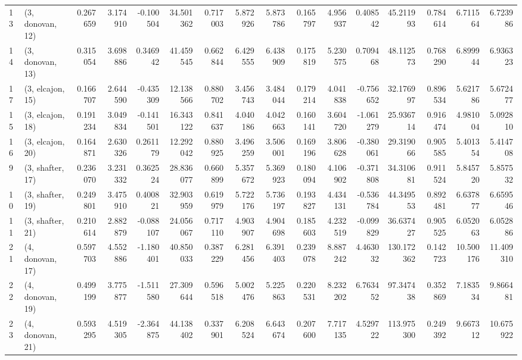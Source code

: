 \begin{tabular}{llrrrrrrrrrrrrrr}
13 &  (3, donovan, 12) &   0.267659 &  3.174910 & -0.100504 &  34.501362 &  0.717003 &   5.872926 &  5.873786 &  0.165797 &  4.956937 &  0.408542 &   45.211993 &  0.784614 &   6.711564 &   6.723986 \\
14 &  (3, donovan, 13) &   0.315054 &  3.698886 &  0.346942 &  41.459545 &  0.662844 &   6.429555 &  6.438909 &  0.175819 &  5.230575 &  0.709468 &   48.112573 &  0.768290 &   6.899944 &   6.936323 \\
17 &  (3, elcajon, 15) &   0.166707 &  2.644590 & -0.435309 &  12.138566 &  0.880702 &   3.456743 &  3.484044 &  0.179214 &  4.041838 & -0.756652 &   32.176997 &  0.896534 &   5.621786 &   5.672477 \\
15 &  (3, elcajon, 18) &   0.191234 &  3.049834 & -0.141501 &  16.343122 &  0.841637 &   4.040186 &  4.042663 &  0.160141 &  3.604720 & -1.061279 &   25.936714 &  0.916474 &   4.981004 &   5.092810 \\
16 &  (3, elcajon, 20) &   0.164871 &  2.630326 &  0.261179 &  12.292042 &  0.880925 &   3.496259 &  3.506001 &  0.169196 &  3.806628 & -0.380061 &   29.319066 &  0.905585 &   5.401354 &   5.414708 \\
9  &  (3, shafter, 17) &   0.236070 &  3.231332 &  0.362524 &  28.836077 &  0.660899 &   5.357672 &  5.369923 &  0.180094 &  4.106902 & -0.371808 &   34.310681 &  0.911524 &   5.845720 &   5.857532 \\
10 &  (3, shafter, 19) &   0.249801 &  3.475910 &  0.400821 &  32.903959 &  0.619979 &   5.722176 &  5.736197 &  0.193827 &  4.434131 & -0.536784 &   44.349553 &  0.892481 &   6.637877 &   6.659546 \\
11 &  (3, shafter, 21) &   0.210614 &  2.882879 & -0.088107 &  24.056067 &  0.717110 &   4.903907 &  4.904698 &  0.185603 &  4.232519 & -0.099829 &   36.637427 &  0.905525 &   6.052063 &   6.052886 \\
21 &  (4, donovan, 17) &   0.597703 &  4.552886 & -1.180401 &  40.850033 &  0.387229 &   6.281456 &  6.391403 &  0.239078 &  8.887242 &  4.463032 &  130.172362 &  0.142723 &  10.500176 &  11.409310 \\
22 &  (4, donovan, 19) &   0.499199 &  3.775877 & -1.511580 &  27.309644 &  0.596518 &   5.002476 &  5.225863 &  0.220531 &  8.232202 &  6.763452 &   97.347438 &  0.352869 &   7.183534 &   9.866481 \\
23 &  (4, donovan, 21) &   0.593295 &  4.519305 & -2.364875 &  44.138402 &  0.337901 &   6.208524 &  6.643674 &  0.207600 &  7.717135 &  4.529722 &  113.975300 &  0.249392 &   9.667312 &  10.675922 \\

\end{tabular}
